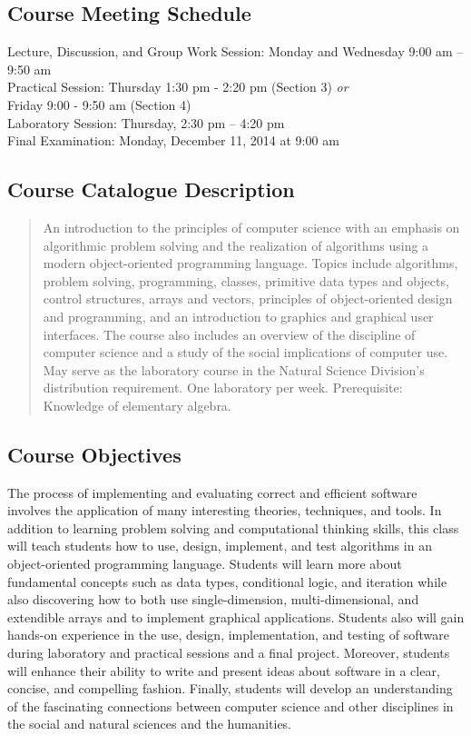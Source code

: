 \subsection*{Course Meeting Schedule}

Lecture, Discussion, and Group Work Session: Monday and Wednesday 9:00 am -- 9:50 am\\
Practical Session: Thursday 1:30 pm - 2:20 pm (Section 3) {\em or} \\ \hspace*{1.2in} Friday 9:00 - 9:50 am (Section 4) \\
Laboratory Session: Thursday, 2:30 pm -- 4:20 pm \\
Final Examination: Monday, December 11, 2014 at 9:00 am

\subsection*{Course Catalogue Description}

\begin{quote}

An introduction to the principles of computer science with an emphasis on algorithmic problem solving and the
realization of algorithms using a modern object-oriented programming language. Topics include algorithms, problem
solving, programming, classes, primitive data types and objects, control structures, arrays and vectors, principles of
object-oriented design and programming, and an introduction to graphics and graphical user interfaces. The course also
includes an overview of the discipline of computer science and a study of the social implications of computer use. May
serve as the laboratory course in the Natural Science Division's distribution requirement. One laboratory per week.
Prerequisite: Knowledge of elementary algebra.

\end{quote}

\subsection*{Course Objectives}

The process of implementing and evaluating correct and efficient software involves the application of many interesting
theories, techniques, and tools.  In addition to learning problem solving and computational thinking
skills, this class will teach students how to use, design, implement, and test algorithms in an object-oriented
programming language. Students will learn more about fundamental concepts such as data types, conditional logic, and
iteration while also discovering how to both use single-dimension, multi-dimensional, and extendible arrays and to implement
graphical applications.  Students also will gain hands-on experience in the use, design, implementation, and testing of
software during laboratory and practical sessions and a final project.  Moreover, students will enhance their ability to
write and present ideas about software in a clear, concise, and compelling fashion.  Finally, students will develop an
understanding of the fascinating connections between computer science and other disciplines in the social and natural
sciences and the humanities.

